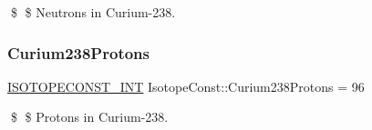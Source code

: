 \$ \$ Neutrons in Curium-\/238. \mbox{\label{group___isotope_const-_curium-_cm238_gaf24928bf94c58e8459c1196a63d05cc0}} 
\subsubsection{\texorpdfstring{Curium238\+Protons}{Curium238Protons}}
{\footnotesize\ttfamily \mbox{\hyperlink{group___isotope_const-_macros_ga5f18360b3e99483a35c32d789e62621c}{I\+S\+O\+T\+O\+P\+E\+C\+O\+N\+S\+T\+\_\+\+I\+NT}} Isotope\+Const\+::\+Curium238\+Protons = 96}

\$ \$ Protons in Curium-\/238. 